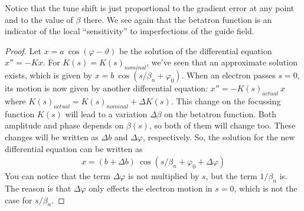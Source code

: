Notice that the tune shift is just proportional to the gradient error at any point and to the value of $\beta$ there. We see again that the betatron function is an indicator of the local ``sensitivity'' to imperfections of the guide field.
\begin{proof}
	Let $x = a\ \cos(\varphi-\vartheta)$ be the solution of the differential equation $x'' = -Kx$. For $K(s) = K(s)_{nominal}$, we've seen that an approximate solution exists, which is given by $x = b\ \cos(s/\beta_n + \varphi_0)$. When an electron passes $s=0$, its motion is now given by another differential equation: $x'' = -K(s)_{actual}\ x$ where $K(s)_{actual} = K(s)_{nominal} + \Delta K(s)$. This change on the focussing function $K(s)$ will lead to a variation $\Delta \beta$ on the betatron function. Both amplitude and phase depends on $\beta(s)$, so both of them will change too. These changes will be written as $\Delta b$ and $\Delta \varphi$, respectively. So, the solution for the new differential equation can be written as
	\begin{align*}
		x = (b+\Delta b)\ \cos(s/\beta_n + \varphi_0 + \Delta \varphi)
	\end{align*}
	You can notice that the term $\Delta \varphi$ is not multiplied by $s$, but the term $1/\beta_n$ is. The reason is that $\Delta \varphi$ only effects the electron motion in $s=0$, which is not the case for $s/\beta_n$.


\end{proof}
